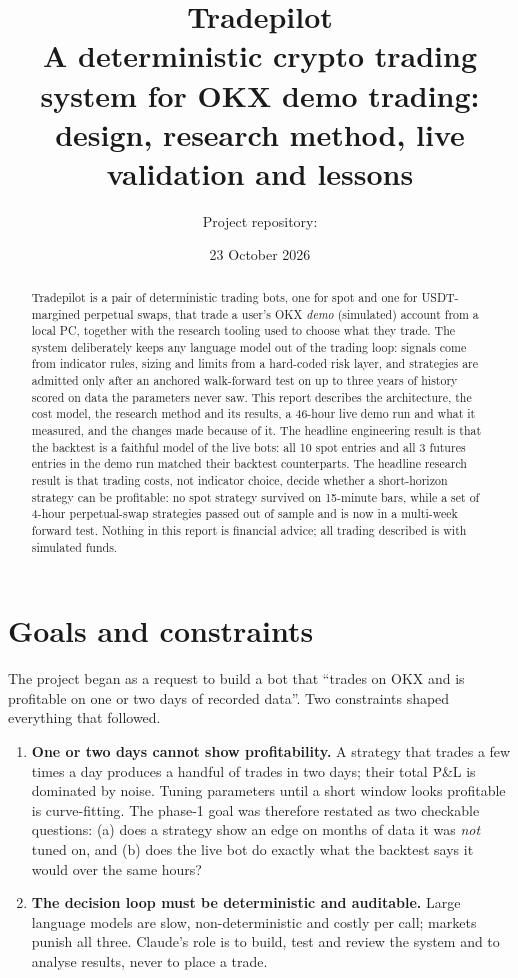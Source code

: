 \documentclass[11pt,a4paper]{article}
\title{\textbf{Tradepilot}\\[4pt]
\large A deterministic crypto trading system for OKX demo trading:\\
design, research method, live validation and lessons}
\author{Project repository: \code{github.com/sa1ffffff/tradepilot}}
\date{23 October 2026}
\begin{document}
\maketitle

\begin{abstract}
\noindent Tradepilot is a pair of deterministic trading bots, one for spot and one for
USDT-margined perpetual swaps, that trade a user's OKX \emph{demo} (simulated) account from
a local PC, together with the research tooling used to choose what they trade. The system
deliberately keeps any language model out of the trading loop: signals come from indicator
rules, sizing and limits from a hard-coded risk layer, and strategies are admitted only after
an anchored walk-forward test on up to three years of history scored on data the parameters
never saw. This report describes the architecture, the cost model, the research method and its
results, a 46-hour live demo run and what it measured, and the changes made because of it.
The headline engineering result is that the backtest is a faithful model of the live bots:
all 10 spot entries and all 3 futures entries in the demo run matched their backtest
counterparts. The headline research result is that trading costs, not indicator choice,
decide whether a short-horizon strategy can be profitable: no spot strategy survived on
15-minute bars, while a set of 4-hour perpetual-swap strategies passed out of sample and is
now in a multi-week forward test. Nothing in this report is financial advice; all trading
described is with simulated funds.
\end{abstract}

\tableofcontents
\bigskip

\section{Goals and constraints}
The project began as a request to build a bot that ``trades on OKX and is profitable on one or
two days of recorded data''. Two constraints shaped everything that followed.

\begin{enumerate}
\item \textbf{One or two days cannot show profitability.} A strategy that trades a few times a
day produces a handful of trades in two days; their total P\&L is dominated by noise. Tuning
parameters until a short window looks profitable is curve-fitting. The phase-1 goal was
therefore restated as two checkable questions: (a) does a strategy show an edge on months of
data it was \emph{not} tuned on, and (b) does the live bot do exactly what the backtest says it
would over the same hours?
\item \textbf{The decision loop must be deterministic and auditable.} Large language models are
slow, non-deterministic and costly per call; markets punish all three. Claude's role is to build,
test and review the system and to analyse results, never to place a trade.
\end{enumerate}
\end{document}
